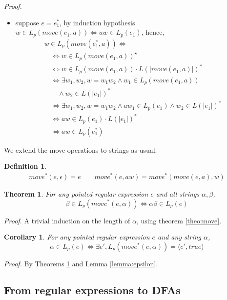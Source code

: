 \documentclass[preprint]{sigplanconf}
\newcommand{\varoast}{\star}
\newcommand{\Le}[1]{L(#1)}
\newcommand{\Lp}[1]{L_p(#1)}
\newcounter{item}
\newtheorem{theorem}[item]{Theorem}
\newtheorem{definition}[item]{Definition}
\newtheorem{corollary}[item]{Corollary}
\newenvironment{proof}{\begin{trivlist}\item[]{\em Proof.}}{\end{trivlist}}
\begin{document}
\begin{proof}
\begin{itemize}
\item suppose $e = e_1^*$,
by induction hypothesis
$w \in \Lp{move(e_1,a)} \Leftrightarrow aw \in \Lp{e_1}$,
hence, 
\[
\begin{array}{l}
w \in \Lp{move(e_1^*,a)} \Leftrightarrow\\ 
\quad \Leftrightarrow w \in L_p(move(e_1,a))^\varoast\\
\quad \Leftrightarrow w \in L_p(move(e_1,a)) \cdot L(|move(e_1,a)|)^*\\
\quad \Leftrightarrow \exists w_1,w_2, w=w_1w_2 \wedge w_1 \in \Lp{move(e_1,a)}\\ 
\quad\quad \wedge w_2 \in \Le{|e_1|}^*\\
\quad \Leftrightarrow \exists w_1,w_2, w=w_1w_2 \wedge aw_1 \in \Lp{e_1}
 \wedge w_2 \in \Le{|e_1|}^*\\
\quad \Leftrightarrow aw \in L_p(e_1) \cdot L(|e_1|)^*\\
\quad \Leftrightarrow aw \in L_p(e_1^*)
\end{array}
\]
\end{itemize}
\end{proof}

We extend the move operations to strings as usual.
\begin{definition}
\[\begin{array}{l}
 move^*(e,\epsilon) = e \quad \quad
 move^*(e,aw) = move^*(move(e,a),w)
\end{array}\]
\end{definition}

\begin{theorem} 
\label{theo:move*}
For any pointed regular expression $e$ and all strings
$\alpha, \beta$, 
\[\beta \in \Lp{move^*(e,\alpha)} \Leftrightarrow \alpha\beta \in  \Lp e \]
\end{theorem}
\begin{proof}
A trivial induction on the length of $\alpha$, using theorem \ref{theo:move}.
\end{proof}

\begin{corollary}
For any pointed regular expression $e$ and any string
$\alpha$, 
\[\alpha \in  \Lp e \Leftrightarrow \exists e', \Lp{move^*(e,\alpha)} = 
\langle e',true \rangle \]
\end{corollary}
\begin{proof}
By Theorems \ref{theo:move*} and Lemma \ref{lemma:epsilon}.
\end{proof}

\subsection{From regular expressions to DFAs}
\end{document}
